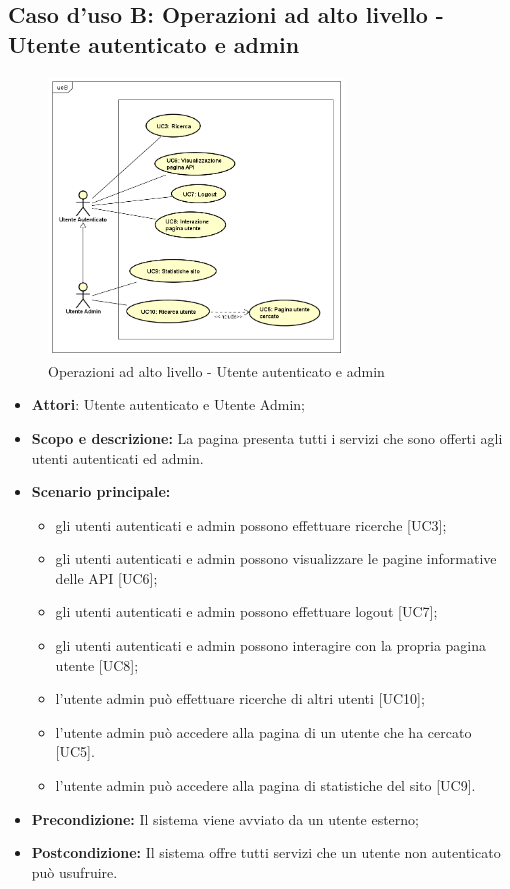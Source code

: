 \documentclass[12pt,a4paper,titlepage]{article}
\begin{document}
	\subsection{Caso d'uso B: Operazioni ad alto livello - Utente autenticato e admin}
	\begin{figure}[ht]
		\centering
		\includegraphics[width=0.7\textwidth]{UseCase/B}
		\caption{Operazioni ad alto livello - Utente autenticato e admin}
	\end{figure}
	\begin{itemize}
		\item \textbf{Attori}: Utente autenticato e Utente Admin;
		\item \textbf{Scopo e descrizione:} La pagina presenta tutti i servizi che sono offerti agli utenti autenticati ed admin.
		\item \textbf{Scenario principale:} 
			\begin{itemize}
				\item gli utenti autenticati e admin possono effettuare ricerche [UC3];
				\item gli utenti autenticati e admin possono visualizzare le pagine informative delle API [UC6];
				\item gli utenti autenticati e admin possono effettuare logout [UC7];
				\item gli utenti autenticati e admin possono  interagire con la propria pagina utente [UC8];
				\item l'utente admin può effettuare ricerche di altri utenti [UC10];
				\item l'utente admin può accedere alla pagina di un utente che ha cercato [UC5].
				\item l'utente admin può accedere alla pagina di statistiche del sito [UC9].
			\end{itemize}
		\item \textbf{Precondizione:} Il sistema viene avviato da un utente esterno;
		\item \textbf{Postcondizione:} Il sistema offre tutti servizi che un utente non autenticato può usufruire.
	\end{itemize}
\end{document}
